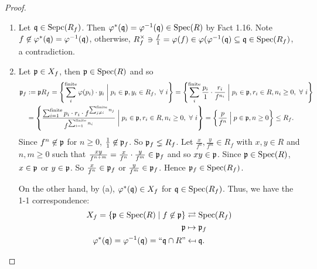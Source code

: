 \begin{proof}
    \begin{enumerate}
        \item Let $\mathfrak{q} \in \operatorname{Sepc}(R_f)$. Then $\varphi^*(\mathfrak{q}) = \varphi^{-1}(\mathfrak{q}) \in \operatorname{Spec}(R)$ by Fact 1.16. Note $f \not \in \varphi^*(\mathfrak{q}) = \varphi^{-1}(\mathfrak{q})$, otherwise, $R_f^\times \ni \frac{f}{1} = \varphi(f) \in \varphi(\varphi^{-1}(\mathfrak{q}) \subseteq \mathfrak{q} \in \operatorname{Spec}(R_f)$, a contradiction. 
        \item 
            Let $\mathfrak{p} \in X_f$, then $\mathfrak{p} \in \operatorname{Spec}(R)$ and so
            \begin{align*}
                \mathfrak{p}_f &:= \mathfrak{p} R_f = \left\{\sum_{i}^{\text{finite}} \varphi(p_{i}) \cdot y_{i} \mathrel{\bigg |} p_{i} \in \mathfrak{p},y_{i} \in R_{f}, \ \forall \  i\right\} = \left\{\sum_{i}^{\text{finite}} \frac{p_{i}}{1} \cdot \frac{r_{i}}{f^{n_{i}}} \mathrel{\bigg |} p_{i} \in \mathfrak{p}, r_{i} \in R, n_{i} \geq 0,\ \forall \  i\right\} \\
                &= \left\{\frac{\sum_{i=1}^{\text{finite}}p_{i} \cdot r_{i} \cdot f^{\sum_{j \neq i}^{\text{finite}}n_{j}}}{f^{\sum_{i=1}^{\text{finite}} n_{i}}} \mathrel{\bigg |} p_{i} \in \mathfrak{p}, r_{i} \in R, n_{i} \geq 0, \ \forall \  i\right\} = \left\{ \frac{p}{f^{n}} \mathrel{\Big |} p \in \mathfrak{p},n \geq 0\right\} \leq R_f.
            \end{align*}
            Since $f^n \not \in \mathfrak{p}$ for $n \geq 0$, $\frac{1}{1} \not \in \mathfrak{p}_f$. So $\mathfrak{p}_f \lneq R_f$. Let $\frac{x}{f^n},\frac{y}{f^m} \in R_f$ with $x,y \in R$ and $n,m \geq 0$ such that $\frac{xy}{f^{n+m}} = \frac{x}{f^n} \cdot \frac{y}{f^m} \in \mathfrak{p}_f$ and so $xy \in \mathfrak{p}$. Since $\mathfrak{p} \in \operatorname{Spec}(R)$, $x \in \mathfrak{p}$ or $y \in \mathfrak{p}$. So $\frac{x}{f^n} \in \mathfrak{p}_f$ or $\frac{y}{f^m} \in \mathfrak{p}_f$. Hence $\mathfrak{p}_f \in \operatorname{Spec}(R_f)$. \par 
            On the other hand, by (a), $\varphi^{*}(\mathfrak{q}) \in X_{f}$ for $\mathfrak{q} \in \operatorname{Spec}(R_{f})$. Thus, we have the 1-1 correspondence:
            \begin{align*}
                X_f = \{\mathfrak{p} \in \operatorname{Spec}(R) \mid f \not \in \mathfrak{p}\} & \rightleftarrows \operatorname{Spec}(R_f) \\
                \mathfrak{p} &\mapsto \mathfrak{p}_f \\ 
                \varphi^*(\mathfrak{q}) = \varphi^{-1}(\mathfrak{q}) = \text{``$\mathfrak{q} \cap R$''} &\mapsfrom \mathfrak{q}. \qedhere
            \end{align*}
    \end{enumerate}
\end{proof}

